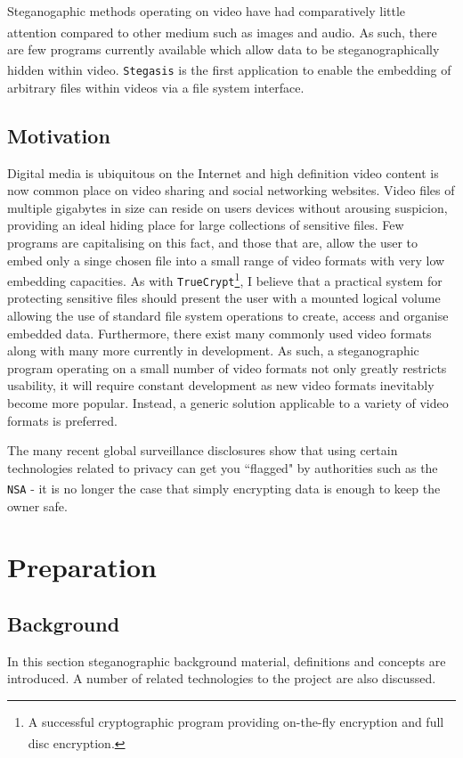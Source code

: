 \documentclass[paper=a4, fontsize=11pt,twoside]{scrartcl}
\numberwithin{table}{section}
\numberwithin{figure}{section}
\numberwithin{algorithm}{section}
\begin{document}
Steganogaphic methods operating on video have had comparatively little attention compared to other medium such as images and audio\textsuperscript{\cite{digmedia2}}. As such, there are few programs currently available which allow data to be steganographically hidden within video\textsuperscript{\cite{survey}}. \texttt{Stegasis} is the first application to enable the embedding of arbitrary files within videos via a file system interface.   



\subsection{Motivation}
Digital media is ubiquitous on the Internet and high definition video content is now common place on video sharing and social networking websites. Video files of multiple gigabytes in size can reside on users devices without arousing suspicion, providing an ideal hiding place for large collections of sensitive files. Few programs are capitalising on this fact, and those that are, allow the user to embed only a singe chosen file into a small range of video formats with very low embedding capacities. As with \texttt{TrueCrypt}\footnote{A successful cryptographic program providing on-the-fly encryption and full disc encryption\textsuperscript{\cite{truecrypt}}.}, I believe that a practical system for protecting sensitive files should present the user with a mounted logical volume allowing the use of standard file system operations to create, access and organise embedded data. Furthermore, there exist many commonly used video formats along with many more currently in development. As such, a steganographic program operating on a small number of video formats not only greatly restricts usability, it will require constant development as new video formats inevitably become more popular. Instead, a generic solution applicable to a variety of video formats is preferred.

The many recent global surveillance disclosures show that using certain technologies related to privacy can get you ``flagged" by authorities such as the \texttt{NSA}\textsuperscript{\cite{nsa}} - it is no longer the case that simply encrypting data is enough to keep the owner safe.

\section{Preparation}
\subsection{Background}
In this section steganographic background material, definitions and concepts are introduced. A number of related technologies to the project are also discussed.\\
\end{document}
